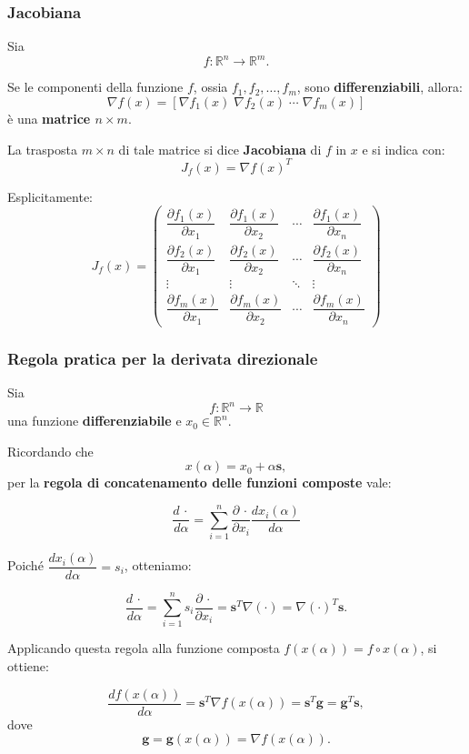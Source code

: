 \subsubsection{Jacobiana}
Sia 
\[
f : \mathbb{R}^n \to \mathbb{R}^m.
\]

Se le componenti della funzione $f$, ossia $f_1, f_2, \ldots, f_m$, sono \textbf{differenziabili}, allora:
\[
\nabla f(x) = [ \nabla f_1(x) \; \nabla f_2(x) \; \cdots \; \nabla f_m(x) ]
\]
è una \textbf{matrice $n \times m$}.

La trasposta $m \times n$ di tale matrice si dice \textbf{Jacobiana} di $f$ in $x$ e si indica con:
\[
J_f(x) = \nabla f(x)^{T}
\]

Esplicitamente:
\[
J_f(x) =
\begin{pmatrix}
\dfrac{\partial f_1(x)}{\partial x_1} & \dfrac{\partial f_1(x)}{\partial x_2} & \cdots & \dfrac{\partial f_1(x)}{\partial x_n} \\[8pt]
\dfrac{\partial f_2(x)}{\partial x_1} & \dfrac{\partial f_2(x)}{\partial x_2} & \cdots & \dfrac{\partial f_2(x)}{\partial x_n} \\[8pt]
\vdots & \vdots & \ddots & \vdots \\[8pt]
\dfrac{\partial f_m(x)}{\partial x_1} & \dfrac{\partial f_m(x)}{\partial x_2} & \cdots & \dfrac{\partial f_m(x)}{\partial x_n}
\end{pmatrix}
\]

\subsubsection{Regola pratica per la derivata direzionale}
Sia 
\[
f : \mathbb{R}^n \to \mathbb{R}
\]
una funzione \textbf{differenziabile} e $x_0 \in \mathbb{R}^n$.

Ricordando che 
\[
x(\alpha) = x_0 + \alpha \mathbf{s},
\]
per la \textbf{regola di concatenamento delle funzioni composte} vale:

\[
\frac{d\,\cdot}{d\alpha} = \sum_{i=1}^{n} \frac{\partial\,\cdot}{\partial x_i} \frac{d x_i(\alpha)}{d\alpha}
\]

Poiché $\dfrac{d x_i(\alpha)}{d\alpha} = s_i$, otteniamo:

\[
\frac{d\,\cdot}{d\alpha} = \sum_{i=1}^{n} s_i \frac{\partial\,\cdot}{\partial x_i} = \mathbf{s}^T \nabla (\cdot) = \nabla(\cdot)^T \mathbf{s}.
\]

Applicando questa regola alla funzione composta $f(x(\alpha)) = f \circ x(\alpha)$, si ottiene:

\[
\frac{d f(x(\alpha))}{d\alpha} = \mathbf{s}^T \nabla f(x(\alpha)) = \mathbf{s}^T \mathbf{g} = \mathbf{g}^T \mathbf{s},
\]
dove 
\[
\mathbf{g} = \mathbf{g}(x(\alpha)) = \nabla f(x(\alpha)).
\]

